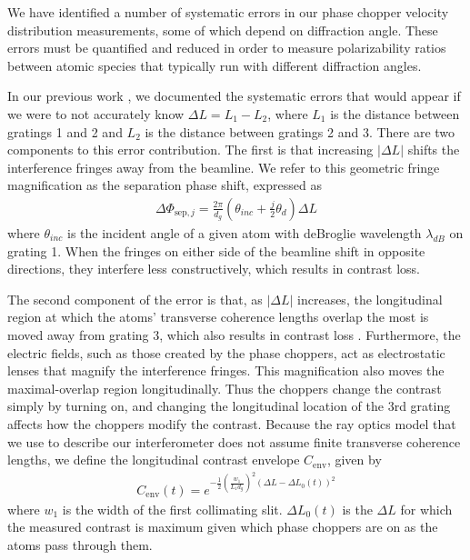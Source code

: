 \documentclass[twocolumn,prl,showpacs,superscriptaddress]{revtex4-1}   %
\newcommand{\dphisepj}{\Delta\Phi_{\mathrm{sep},j}}
\newcommand{\cenv}{C_{\mathrm{env}}}
\begin{document}
We have identified a number of systematic errors in our phase chopper velocity distribution measurements, some of which depend on diffraction angle. These errors must be quantified and reduced in order to measure polarizability ratios between atomic species that typically run with different diffraction angles.

In our previous work \cite{Hromada2014}, we documented the systematic errors that would appear if we were to not accurately know $\Delta L = L_1 - L_2$, where $L_1$ is the distance between gratings 1 and 2 and $L_2$ is the distance between gratings 2 and 3. There are two components to this error contribution. The first is that increasing $|\Delta L|$ shifts the interference fringes away from the beamline. We refer to this geometric fringe magnification as the separation phase shift, expressed as
\begin{align}
	\dphisepj = \frac{2\pi}{d_g}
	\left(
		\theta_{inc} + \frac{j}{2}\theta_d
	\right) \Delta L
	\label{phiSep}
\end{align}
where $\theta_{inc}$ is the incident angle of a given atom with deBroglie wavelength $\lambda_{dB}$ on grating 1.
When the fringes on either side of the beamline shift in opposite directions, they interfere less constructively, which results in contrast loss.

The second component of the error is that, as $|\Delta L|$ increases, the longitudinal region at which the atoms' transverse coherence lengths overlap the most is moved away from grating 3, which also results in contrast loss \cite{Champenois1999,McMorran2008}. Furthermore, the electric fields, such as those created by the phase choppers, act as electrostatic lenses that magnify the interference fringes. This magnification also moves the maximal-overlap region longitudinally. Thus the choppers change the contrast simply by turning on, and changing the longitudinal location of the 3rd grating affects how the choppers modify the contrast. Because the ray optics model that we use to describe our interferometer does not assume finite transverse coherence lengths, we define the longitudinal contrast envelope $\cenv$, given by
\begin{align}
	\cenv(t) = e^{-\frac{1}{2} \left( \frac{w_1}{L_1 d_g} \right)^2 (\Delta L - \Delta L_0(t))^2}
	\label{CEnv}
\end{align}
where $w_1$ is the width of the first collimating slit. $\Delta L_0(t)$ is the $\Delta L$ for which the measured contrast is maximum given which phase choppers are on as the atoms pass through them.
\end{document}
